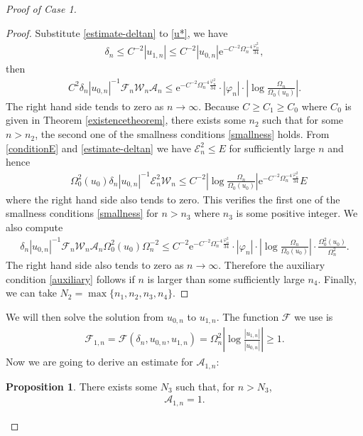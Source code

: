 \documentclass[11pt,reqno]{amsart}
\theoremstyle{definition}
\newtheorem{proposition}{Proposition}[section]
\numberwithin{equation}{section}
\begin{document}
\begin{proof}[Proof of Case 1]
\begin{proof}
 Substitute \eqref{estimate-deltan} to \eqref{u*}, we have
\begin{align}\label{estimate-deltanun-1}
\delta_n\le C^{-2}|u_{1,n}|\le C^{-2}|u_{0,n}|\mathrm{e}^{-C^{-2}\Omega_n^{-4}\frac{\varphi_n^2}{34}},
\end{align}
then
\begin{align*}
C^2\delta_n|u_{0,n}|^{-1}\mathscr{F}_n\mathscr{W}_n\mathcal{A}_n\le \mathrm{e}^{-C^{-2}\Omega_n^{-4}\frac{\varphi_n^2}{34}}\cdot|\varphi_n|\cdot\left|\log\frac{\Omega_n}{\Omega_0(u_0)}\right|.
\end{align*}
The right hand side tends to zero as $n\to\infty$. Because $C\ge C_1\ge C_0$ where $C_0$ is given in Theorem \ref{existencetheorem}, there exists some $n_2$ such that for some $n>n_2$, the second one of the smallness conditions \eqref{smallness} holds. From \eqref{conditionE} and \eqref{estimate-deltan} we have $\mathscr{E}_n^2\le E$ for sufficiently large $n$ and
hence
\begin{align*}
&\Omega_0^2(u_0)\delta_n|u_{0,n}|^{-1}\mathscr{E}_n^2\mathscr{W}_n\le C^{-2}\left|\log\frac{\Omega_n}{\Omega_0(u_0)}\right|\mathrm{e}^{-C^{-2}\Omega_n^{-4}\frac{\varphi_n^2}{34}}E
\end{align*}
where the right hand side also tends to zero. This verifies the first one of the smallness conditions \eqref{smallness} for $n>n_3$ where $n_3$ is some positive integer. We also compute
\begin{align*}
\delta_n|u_{0,n}|^{-1}\mathscr{F}_n\mathscr{W}_n\mathcal{A}_n\Omega_0^2(u_0)\Omega_n^{-2}\le C^{-2} \mathrm{e}^{-C^{-2}\Omega_n^{-4}\frac{\varphi_n^2}{34}}\cdot|\varphi_n|\cdot\left|\log\frac{\Omega_n}{\Omega_0(u_0)}\right|\cdot\frac{\Omega_0^2(u_0)}{\Omega_n^2}.
\end{align*}
The right hand side also tends to zero as $n\to\infty$. Therefore the auxiliary condition \eqref{auxiliary} follows if $n$ is larger than some sufficiently large $n_4$. Finally, we can take $N_2=\max\{n_1,n_2,n_3,n_4\}$.
\end{proof}

We will then solve the solution from $u_{0,n}$ to $u_{1,n}$. The function $\mathscr{F}$ we use is
\begin{align}\label{def-F*n}
\mathscr{F}_{1,n}=\mathscr{F}(\delta_n,u_{0,n},u_{1,n})=\Omega_n^2\left|\log\frac{|u_{1,n}|}{|u_{0,n}|}\right|\ge 1.
\end{align}
Now we are going to derive an estimate for $\mathcal{A}_{1,n}$:
\begin{proposition} There exists some $N_3$ such that, for $n>N_3$,
\begin{align}\label{estimate-A*n}
\mathcal{A}_{1,n}=1.
\end{align}
\end{proposition}


\end{proof}
\end{document}
